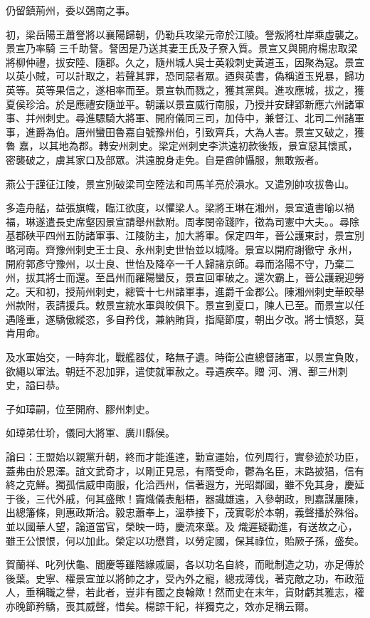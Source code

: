 \begin{pinyinscope}
 仍留鎮荊州，委以鵶南之事。



 初，梁岳陽王蕭詧將以襄陽歸朝，仍勒兵攻梁元帝於江陵。詧叛將杜岸乘虛襲之。景宣乃率騎
 三千助詧。詧因是乃送其妻王氏及子寮入質。景宣又與開府楊忠取梁將柳仲禮，拔安陸、隨郡。久之，隨州城人吳士英殺刺史黃道玉，因聚為寇。景宣以英小賊，可以計取之，若聲其罪，恐同惡者眾。迺與英書，偽稱道玉兇暴，歸功英等。英等果信之，遂相率而至。景宣執而戮之，獲其黨與。進攻應城，拔之，獲夏侯珍洽。於是應禮安隨並平。朝議以景宣威行南服，乃授并安肆郢新應六州諸軍事、并州刺史。尋進驃騎大將軍、開府儀同三司，加侍中，兼督江、北司二州諸軍事，進爵為伯。唐州蠻田魯嘉自號豫州伯，引致齊兵，大為人害。景宣又破之，獲魯
 嘉，以其地為郡。轉安州刺史。梁定州刺史李洪遠初款後叛，景宣惡其懷貳，密襲破之，虜其家口及部眾。洪遠脫身走免。自是酋帥懾服，無敢叛者。



 燕公于謹征江陵，景宣別破梁司空陸法和司馬羊亮於溳水。又遣別帥攻拔魯山。



 多造舟艋，益張旗幟，臨江欲度，以懼梁人。梁將王琳在湘州，景宣遺書喻以禍福，琳遂遣長史席壑因景宣請舉州款附。周孝閔帝踐阼，徵為司憲中大夫。。尋除基鄀硤平四州五防諸軍事、江陵防主，加大將軍。保定四年，晉公護東討，景宣別略河南。齊豫州刺史王士良、永州刺史世怡並以城降。景宣以開府謝徹守
 永州，開府郭彥守豫州，以士良、世怡及降卒一千人歸諸京師。尋而洛陽不守，乃棄二州，拔其將士而還。至昌州而羅陽蠻反，景宣回軍破之。還次霸上，晉公護親迎勞之。天和初，授荊州刺史，總管十七州諸軍事，進爵千金郡公。陳湘州刺史華皎舉州款附，表請援兵。敕景宣統水軍與皎俱下。景宣到夏口，陳人已至。而景宣以任遇隆重，遂驕傲縱恣，多自矜伐，兼納賄貨，指麾節度，朝出夕改。將士憤怒，莫肯用命。



 及水軍始交，一時奔北，戰艦器仗，略無孑遺。時衛公直總督諸軍，以景宣負敗，欲繩以軍法。朝廷不忍加罪，遣使就軍赦之。尋遇疾卒。贈
 河、渭、鄯三州刺史，謚曰恭。



 子如璋嗣，位至開府、膠州刺史。



 如璋弟仕玠，儀同大將軍、廣川縣侯。



 論曰：王盟始以親黨升朝，終而才能進達，勤宣運始，位列周行，實參迹於功臣，蓋弗由於恩澤。誼文武奇才，以剛正見忌，有隋受命，鬱為名臣，末路披猖，信有終之克鮮。獨孤信威申南服，化洽西州，信著遐方，光昭鄰國，雖不免其身，慶延于後，三代外戚，何其盛歟！竇熾儀表魁梧，器識雄遠，入參朝政，則嘉謀屢陳，出總籓條，則惠政斯洽。毅忠蕭奉上，溫恭接下，茂實彰於本朝，義聲播於殊俗。並以國華人望，論道當官，榮映一時，慶流來葉。及
 熾遲疑勸進，有送故之心，雖王公恨恨，何以加此。榮定以功懋賞，以勞定國，保其祿位，貽厥子孫，盛矣。



 賀蘭祥、叱列伏龜、閻慶等雖階緣戚屬，各以功名自終，而毗制造之功，亦足傳於後葉。史寧、權景宣並以將帥之才，受內外之寵，總戎薄伐，著克敵之功，布政蒞人，垂稱職之譽，若此者，豈非有國之良翰歟！然而史在末年，貨財虧其雅志，權亦晚節矜驕，喪其威聲，惜矣。楊諒干紀，祥獨克之，效亦足稱云爾。



\end{pinyinscope}